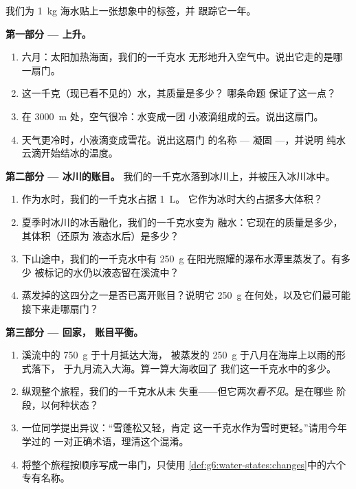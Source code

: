 \begin{problem}\label{pb:g6:water-states:1}
我们为 \qty{1}{kg} 海水贴上一张想象中的标签，并
跟踪它一年。

\medskip\noindent\textbf{第一部分 --- 上升。}
\begin{enumerate}
  \item 六月：太阳加热海面，我们的一千克水
        无形地升入空气中。说出它走的是哪一扇门。
  \item 这一千克（现已看不见的）水，其质量是多少？
        哪条命题
        保证了这一点？
  \item 在 \qty{3000}{m} 处，空气很冷：水变成一团
        小液滴组成的云。说出这扇门。
  \item 天气更冷时，小液滴变成雪花。说出这扇门
        的名称 --- 凝固 ---，并说明
        纯水云滴开始结冰的温度。
\end{enumerate}

\medskip\noindent\textbf{第二部分 --- 冰川的账目。}
我们的一千克水落到冰川上，并被压入冰川冰中。
\begin{enumerate}[resume]
  \item 作为水时，我们的一千克水占据 \qty{1}{L}。
        它作为冰时大约占据多大体积？
  \item 夏季时冰川的冰舌融化，我们的一千克水变为
        融水：它现在的质量是多少，其体积（还原为
        液态水后）是多少？
  \item 下山途中，我们的一千克水中有 \qty{250}{g}
        在阳光照耀的瀑布水潭里蒸发了。有多少
        被标记的水仍以液态留在溪流中？
  \item 蒸发掉的这四分之一是否已离开账目？说明它
        \qty{250}{g} 在何处，以及它们最可能
        接下来走哪扇门？
\end{enumerate}

\medskip\noindent\textbf{第三部分 --- 回家，
账目平衡。}
\begin{enumerate}[resume]
  \item 溪流中的 \qty{750}{g} 于十月抵达大海，
        被蒸发的 \qty{250}{g} 于八月在海岸上以雨的形式落下，
        于九月流入大海。算一算大海收回了
        我们这一千克水中的多少。
  \item 纵观整个旅程，我们的一千克水从未
        失重——但它两次\emph{看不见}。是在哪些
        阶段，以何种状态？
  \item 一位同学提出异议：“雪蓬松又轻，肯定
        这一千克水作为雪时更轻。”请用今年学过的
        一对正确术语，理清这个混淆。
  \item 将整个旅程按顺序写成一串门，只使用
        \cref{def:g6:water-states:changes}中的六个
        专有名称。
\end{enumerate}
\end{problem}
